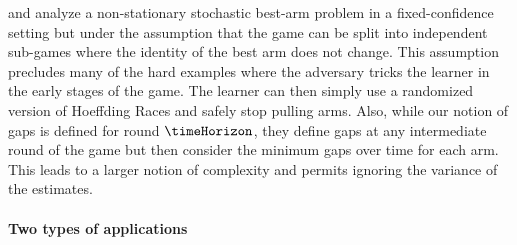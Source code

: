 \cite{Allesiardo2017SL} and \cite{Allesiardo17NS} analyze
a non-stationary stochastic best-arm problem in a fixed-confidence 
setting but under the assumption that the game can be split into independent
sub-games where the identity of the best arm does not change. This 
assumption precludes many of the hard examples where the adversary 
tricks the learner in the early stages of the game. The
learner can then simply use a randomized version
of Hoeffding Races and safely stop pulling arms. 
Also, while our notion of gaps is defined for round $\timeHorizon$, 
they define gaps at any intermediate round of the game 
but then consider the minimum gaps over time for each arm.
This leads to a larger notion of complexity and permits ignoring the variance of the estimates.
\vspace{.2cm}

%
%
%
\paragraph{Two  types of applications}  

